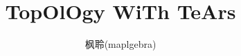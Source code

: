 
\usepackage{ctex}
\usepackage{tikz}
\usetikzlibrary{cd}

\usepackage{mathrsfs} %
\usepackage{amsthm}
\usepackage{amsmath}
\usepackage{amssymb}
\usepackage{mathtools}




\usepackage{blindtext}
\usepackage{bm}
\parindent=0pt
\setlength{\parindent}{2em} 
\usepackage{indentfirst}

\usepackage{graphicx} %

\usepackage{xcolor}
\usepackage{titlesec}

\usepackage{tocloft}
\renewcommand{\cftsecfont}{\color{blue}\bfseries\large}
\renewcommand{\cftsubsecfont}{\color{blue}}


\newenvironment{claim}[1]{\par\noindent\underline{Claim:}\space#1}{}

\newcommand*{\xfunc}[4]{{#2}\colon{#3}{#1}{#4}}
\newcommand*{\func}[3]{\xfunc{\to}{#1}{#2}{#3}}
\newcommand\tpl{\mathcal{T}}

\newcommand\Set[2]{\{\,#1\mid#2\,\}} %
\newcommand\SET[2]{\Set{#1}{\text{#2}}} %

\title{TopOlOgy WiTh TeArs}
\author{枫聆(maplgebra)}
\maketitle

